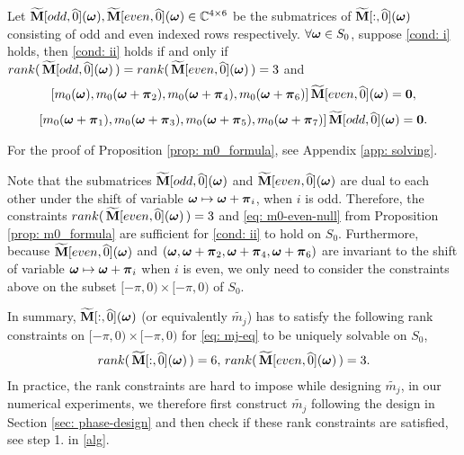 \begin{proposition}\label{prop: m0_formula}
Let $\widetilde{\mathbf{M}}[odd,\widehat{0}](\boldsymbol{\omega}),\widetilde{\mathbf{M}}[even,\widehat{0}](\boldsymbol{\omega})\in\mathbb{C}^{4\times6}$ be the submatrices of $\widetilde{\mathbf{M}}[:,\widehat{0}](\boldsymbol{\omega})$ consisting of odd and even indexed rows respectively. $\forall\boldsymbol{\omega}\in S_0$, suppose {\rm\ref{cond: i}} holds, then {\rm\ref{cond: ii}} holds if and only if $rank(\,\widetilde{\mathbf{M}}[odd,\widehat{0}](\boldsymbol{\omega})\,) = rank(\,\widetilde{\mathbf{M}}[even,\widehat{0}](\boldsymbol{\omega})\,) = 3$ and 
\begin{align}\label{eq: m0-even-null}
[m_0(\boldsymbol{\omega}),m_0(\boldsymbol{\omega}+\boldsymbol{\pi}_2), m_0(\boldsymbol{\omega} +\boldsymbol{\pi}_4), m_0(\boldsymbol{\omega}+\boldsymbol{\pi}_6)]\, \widetilde{\mathbf{M}}[even,\widehat{0}](\boldsymbol{\omega}) = \boldsymbol{0},
\end{align}
\begin{align}\label{eq: m0-odd-null}
[m_0(\boldsymbol{\omega}+\boldsymbol{\pi}_1),m_0(\boldsymbol{\omega}+\boldsymbol{\pi}_3), m_0(\boldsymbol{\omega} +\boldsymbol{\pi}_5), m_0(\boldsymbol{\omega}+\boldsymbol{\pi}_7)] \,\widetilde{\mathbf{M}}[odd,\widehat{0}](\boldsymbol{\omega}) = \boldsymbol{0}.
\end{align}
\end{proposition}

For the proof of Proposition \ref{prop: m0_formula}, see Appendix \ref{app: solving}.

Note that the submatrices $\widetilde{\mathbf{M}}[odd,\widehat{0}](\boldsymbol{\omega})$ and $\widetilde{\mathbf{M}}[even,\widehat{0}](\boldsymbol{\omega})$ are dual to each other under the shift of variable $\boldsymbol{\omega}\mapsto \boldsymbol{\omega}+\boldsymbol{\pi}_i$, when $i$ is odd. Therefore, the constraints $rank(\,\widetilde{\mathbf{M}}[even,\widehat{0}](\boldsymbol{\omega})\,) = 3$ and \eqref{eq: m0-even-null} from Proposition \ref{prop: m0_formula} are sufficient for \ref{cond: ii} to hold on $S_0$. Furthermore, because $\widetilde{\mathbf{M}}[even, \widehat{0}](\boldsymbol{\omega})$ and $(\boldsymbol{\omega},\boldsymbol{\omega}+\boldsymbol{\pi}_2,\boldsymbol{\omega}+\boldsymbol{\pi}_4, \boldsymbol{\omega} + \boldsymbol{\pi}_6)$ are invariant to the shift of variable $\boldsymbol{\omega}\mapsto\boldsymbol{\omega}+\boldsymbol{\pi}_i$ when $i$ is even, we only need to consider the constraints above on the subset $[-\pi,0)\times[-\pi,0)$ of $S_0$.

In summary, $\widetilde{\mathbf{M}}[:,\widehat{0}](\boldsymbol{\omega})$ (or equivalently $\widetilde{m_j}$) has to satisfy the following rank constraints on $[-\pi,0)\times[-\pi,0)$ for \eqref{eq: mj-eq} to be uniquely solvable on $S_0$, 
\begin{align}\label{eq: Mranks}
rank(\,\widetilde{\mathbf{M}}[:,\widehat{0}](\boldsymbol{\omega})\,) = 6,\, rank(\,\widetilde{\mathbf{M}}[even,\widehat{0}](\boldsymbol{\omega})\,) = 3.
\end{align}
In practice, the rank constraints are hard to impose while designing $\widetilde{m_j}$, in our numerical experiments, we therefore first construct $\widetilde{m_j}$ following the design in Section \ref{sec: phase-design} and then check if these rank constraints are satisfied, see step 1. in \ref{alg}.

